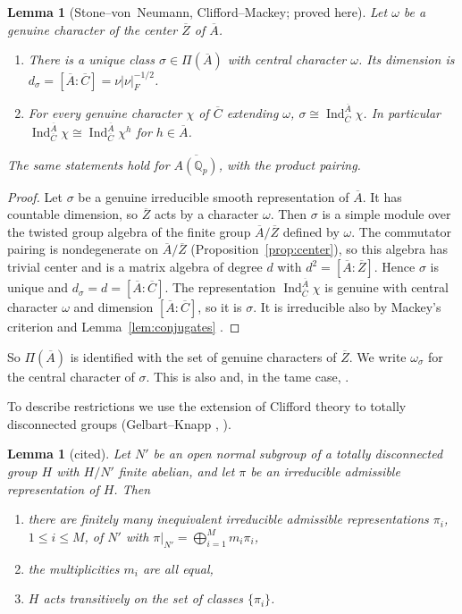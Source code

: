 \documentclass[12pt,letterpaper]{article}
\numberwithin{equation}{section}
\newtheorem{lemma}[theorem]{Lemma}
\theoremstyle{definition}
\newcommand{\proved}{proved here}
\newcommand{\cited}{cited}
\newcommand{\Q}{\mathbb Q}
\newcommand{\bA}{\overline{A}}
\newcommand{\bC}{\overline{C}}
\newcommand{\bZ}{\overline{Z}}
\DeclareMathOperator{\Ind}{Ind}
\begin{document}
\begin{lemma}[Stone--von~Neumann, Clifford--Mackey; \proved]\label{lem:SvN}
Let $\omega$ be a genuine character of the center $\bZ$ of $\bA$.
\begin{enumerate}[label=(\alph*),leftmargin=*,itemsep=1pt]
\item There is a unique class $\sigma\in\Pi(\bA)$ with central character $\omega$.  Its
dimension is $d_\sigma=[\bA:\bC]=\nu|\nu|_F^{-1/2}$.
\item For every genuine character $\chi$ of $\bC$ extending $\omega$,
$\sigma\cong\Ind_{\bC}^{\bA}\chi$.  In particular
$\Ind_{\bC}^{\bA}\chi\cong\Ind_{\bC}^{\bA}\chi^h$ for $h\in\bA$.
\end{enumerate}
The same statements hold for $\overline{A(\Q_p)}$, with the product pairing.
\end{lemma}
\begin{proof}
Let $\sigma$ be a genuine irreducible smooth representation of $\bA$.  It has countable
dimension, so $\bZ$ acts by a character $\omega$.  Then $\sigma$ is a simple module over the
twisted group algebra of the finite group $\bA/\bZ$ defined by $\omega$.  The commutator
pairing is nondegenerate on $\bA/\bZ$ (Proposition~\ref{prop:center}), so this algebra has
trivial center and is a matrix algebra of degree $d$ with $d^2=[\bA:\bZ]$.  Hence $\sigma$ is
unique and $d_\sigma=d=[\bA:\bC]$.  The representation $\Ind_{\bC}^{\bA}\chi$ is genuine with
central character $\omega$ and dimension $[\bA:\bC]$, so it is $\sigma$.  It is irreducible
also by Mackey's criterion and Lemma~\ref{lem:conjugates} \cite[\S7.4]{Se77}.
\end{proof}

So $\Pi(\bA)$ is identified with the set of genuine characters of $\bZ$.  We write
$\omega_\sigma$ for the central character of $\sigma$.  This is also \cite[Lemmas~3.1,
3.2]{Sz19} and, in the tame case, \cite[Theorem~5.1]{Mc12}.

To describe restrictions we use the extension of Clifford theory to totally disconnected
groups (Gelbart--Knapp \cite{GK82}, \cite[Ch.~I, \S2]{BZ76}).

\begin{lemma}[\cited]\label{lem:clifford1}
Let $N'$ be an open normal subgroup of a totally disconnected group $H$ with $H/N'$ finite
abelian, and let $\pi$ be an irreducible admissible representation of $H$.  Then
\begin{enumerate}[label=(\alph*),leftmargin=*,itemsep=1pt]
\item there are finitely many inequivalent irreducible admissible representations $\pi_i$,
$1\le i\le M$, of $N'$ with $\pi|_{N'}=\bigoplus_{i=1}^Mm_i\pi_i$,
\item the multiplicities $m_i$ are all equal,
\item $H$ acts transitively on the set of classes $\{\pi_i\}$.
\end{enumerate}
\end{lemma}
\end{document}

